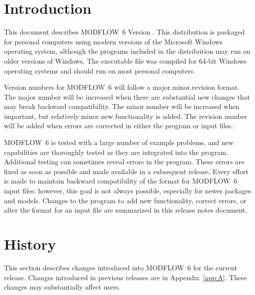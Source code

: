 \documentclass[11pt,twoside,twocolumn]{usgsreport}
\begin{document}
\ifdef{\makefrontcoveralt}{\makefrontcoveralt}{\makefrontcover}

\ifdef{\makefrontmatterabv}{\makefrontmatterabv}{\makefrontmatter}

\onecolumn
\pagestyle{body}
\RaggedRight
{}
\pagestyle{body}
\setlength{\parindent}{1.5pc}

\section{Introduction}
This document describes MODFLOW~6 Version \modflowversion.  This distribution is packaged for personal computers using modern versions of the Microsoft Windows operating system, although the programs included in the distribution may run on older versions of Windows.  The executable file was compiled for 64-bit Windows operating systems and should run on most personal computers.

Version numbers for MODFLOW~6 will follow a major.minor.revision format.  The major number will be increased when there are substantial new changes that may break backward compatibility.  The minor number will be increased when important, but relatively minor new functionality is added.  The revision number will be added when errors are corrected in either the program or input files.

MODFLOW~6 is tested with a large number of example problems, and new capabilities are thoroughly tested as they are integrated into the program.  Additional testing can sometimes reveal errors in the program.  These errors are fixed as soon as possible and made available in a subsequent release.  Every effort is made to maintain backward compatibility of the format for MODFLOW~6 input files; however, this goal is not always possible, especially for newer packages and models.  Changes to the program to add new functionality, correct errors, or alter the format for an input file are summarized in this release notes document.

\section{History}
This section describes changes introduced into MODFLOW~6 for the current release.  Changes introduced in previous releases are in Appendix~\ref{app:A}. These changes may substantially affect users.
\end{document}
